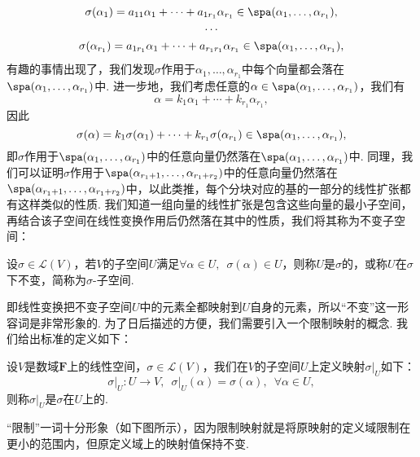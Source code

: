 \begin{gather*}
    \sigma(\alpha_1)=a_{11}\alpha_1+\cdots+a_{1r_1}\alpha_{r_1}\in \spa(\alpha_1,\ldots,\alpha_{r_1}),\\
    \cdots\\
    \sigma(\alpha_{r_1})=a_{1r_1}\alpha_1+\cdots+a_{r_1r_1}\alpha_{r_1}\in \spa(\alpha_1,\ldots,\alpha_{r_1}),
\end{gather*}
有趣的事情出现了，我们发现$\sigma$作用于$\alpha_1,\ldots,\alpha_{r_1}$中每个向量都会落在$\spa(\alpha_1,\ldots,\alpha_{r_1})$中. 进一步地，我们考虑任意的$\alpha\in\spa(\alpha_1,\ldots,\alpha_{r_1})$，我们有
\[\alpha=k_1\alpha_1+\cdots+k_{r_1}\alpha_{r_1},\]
因此
\[\sigma(\alpha)=k_1\sigma(\alpha_1)+\cdots+k_{r_1}\sigma(\alpha_{r_1})\in \spa(\alpha_1,\ldots,\alpha_{r_1}),\]
即$\sigma$作用于$\spa(\alpha_1,\ldots,\alpha_{r_1})$中的任意向量仍然落在$\spa(\alpha_1,\ldots,\alpha_{r_1})$中. 同理，我们可以证明$\sigma$作用于$\spa(\alpha_{r_1+1},\ldots,\alpha_{r_1+r_2})$中的任意向量仍然落在$\spa(\alpha_{r_1+1},\ldots,\alpha_{r_1+r_2})$中，以此类推，每个分块对应的基的一部分的线性扩张都有这样类似的性质. 我们知道一组向量的线性扩张是包含这些向量的最小子空间，再结合该子空间在线性变换作用后仍然落在其中的性质，我们将其称为不变子空间：
\begin{definition}{}{}
    设$\sigma\in \mathcal{L}(V)$，若$V$的子空间$U$满足$\forall \alpha\in U,\enspace \sigma(\alpha)\in U$，则称$U$是$\sigma$的，或称$U$在$\sigma$下不变，简称为$\sigma$-子空间.
\end{definition}

即线性变换把不变子空间$U$中的元素全都映射到$U$自身的元素，所以``不变''这一形容词是非常形象的. 为了日后描述的方便，我们需要引入一个限制映射的概念. 我们给出标准的定义如下：
\begin{definition}{}{} 
    设$V$是数域$\mathbf{F}$上的线性空间，$\sigma\in\mathcal{L}(V)$，我们在$V$的子空间$U$上定义映射$\sigma\vert_U$如下：
    \[\sigma\vert_U:U\to V,\enspace\sigma\vert_U(\alpha)=\sigma(\alpha),\enspace\forall \alpha\in U,\]
    则称$\sigma\vert_U$是$\sigma$在$U$上的.
\end{definition}

``限制''一词十分形象（如下图所示），因为限制映射就是将原映射的定义域限制在更小的范围内，但原定义域上的映射值保持不变.
\begin{figure}[H]
    \centering
\end{figure}

